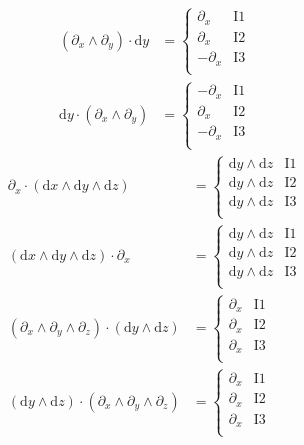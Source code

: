 \documentclass[\ifafour a4paper,12pt,\else a5paper,10pt,\fi%
onecolumn,oneside,article,%
british%
]{memoir}
\theoremstyle{remark}
\theoremstyle{innote}
\newcommand*{\de}{\partialup}%
\newcommand*{\di}{\mathrm{d}}%
\renewcommand*{\|}[1][]{\nonscript\:#1\vert\nonscript\:\mathopen{}}
\begin{document}
\begin{align}
  \label{eq:examples_choices_inner_two_y3}
  (\de_{x} \land \de_{y}) \cdot \di y &=
  \begin{cases}
    \de_{x} &\text{I1}\\
    \de_{x} &\text{I2}\\
    -\de_{x} &\text{I3}\\
  \end{cases}
\\
  \label{eq:examples_choices_inner_two_y4}
 \di y \cdot (\de_{x} \land \de_{y}) &=
  \begin{cases}
    -\de_{x} &\text{I1}\\
   \de_{x} &\text{I2}\\
    -\de_{x} &\text{I3}\\
  \end{cases}
\end{align}
\begin{align}
  \label{eq:examples_choices_inner_three}
 \de_{x} \cdot (\di x \land \di y \land \di z) &=
  \begin{cases}
    \di y \land \di z &\text{I1}\\
    \di y \land \di z &\text{I2}\\
    \di y \land \di z &\text{I3}\\
  \end{cases}
  \\
  (\di x \land \di y \land \di z) \cdot \de_{x} &=
  \begin{cases}
    \di y \land \di z &\text{I1}\\
    \di y \land \di z &\text{I2}\\
    \di y \land \di z &\text{I3}\\
  \end{cases}
  \\
  (\de_{x} \land \de_{y} \land \de_{z}) \cdot (\di y \land \di z) &=
  \begin{cases}
    \de_{x}  &\text{I1}\\
    \de_{x}  &\text{I2}\\
    \de_{x}  &\text{I3}\\
  \end{cases}
  \\
  (\di y \land \di z) \cdot (\de_{x} \land \de_{y} \land \de_{z})  &=
  \begin{cases}
    \de_{x} &\text{I1}\\
    \de_{x} &\text{I2}\\
    \de_{x} &\text{I3}\\
  \end{cases}
\end{align}
\end{document}
